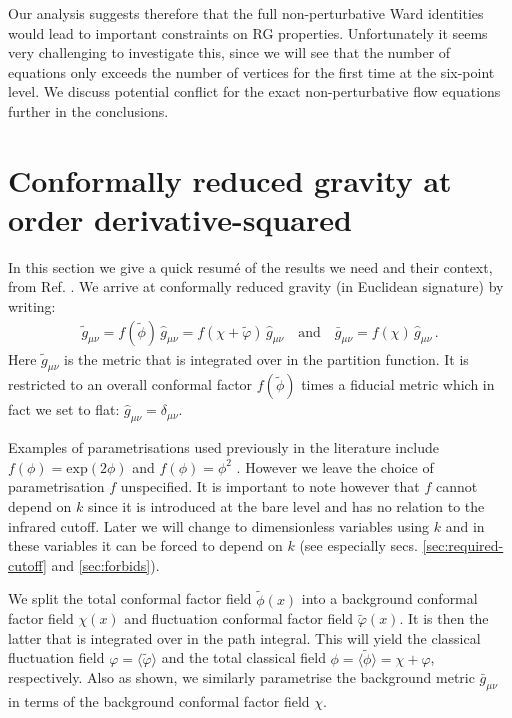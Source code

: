 \documentclass[11pt]{book} %
\newcommand{\vp}{\varphi}
\numberwithin{equation}{chapter}
\begin{document}
Our analysis suggests therefore that the full non-perturbative Ward identities would lead
to important constraints on RG properties. Unfortunately it seems very challenging to investigate this,
since we will see that the number of equations only exceeds the number of vertices for the first time
at the six-point level.
We discuss potential conflict for the exact non-perturbative flow equations further in the conclusions.


\section{Conformally reduced gravity at order derivative-squared}
\label{sec:review}

In this section we give a quick resum\'e of the results we need and their context,
from Ref. \cite{Dietz:2015owa}.
We arrive at conformally reduced gravity (in Euclidean signature) by writing:
\begin{align}
  \tilde g_{\mu\nu} = f(\tilde\phi) \, \hat g_{\mu\nu}
                    = f(\chi +\tilde\varphi ) \, \hat g_{\mu\nu}
  \quad \text{and} \quad
  \bar g_{\mu\nu} = f(\chi) \, \hat g_{\mu\nu} \,.
  \label{conformal-reduction}
\end{align}
Here $\tilde g_{\mu\nu}$ is the metric that is integrated over in the partition function.
It is restricted to an overall conformal factor $f(\tilde\phi)$ times a fiducial metric which
in fact we set to flat: $\hat g_{\mu\nu}=\delta_{\mu\nu}$.

Examples of parametrisations used previously in the literature include
$f(\phi) = \mathrm{exp}(2\phi)$ \cite{Machado:2009ph} and
$f(\phi) = \phi^2$ \cite{Manrique:2009uh, Bonanno:2012dg}.
However we leave the choice of parametrisation $f$ unspecified.
It is important to note however that $f$ cannot depend on $k$ since it is introduced at the bare level
and has no relation to the infrared cutoff.
Later we will change to dimensionless variables using $k$ and in these variables it can be forced
to depend on $k$ (see especially secs. \ref{sec:required-cutoff} and \ref{sec:forbids}).

We split the total conformal factor field $\tilde\phi(x)$ into a background conformal factor
field $\chi(x)$ and fluctuation conformal factor field $\tilde\vp(x)$.
It is then the latter that is integrated over in the path integral.
This will yield the classical fluctuation field $\vp = \langle \tilde \vp \rangle$ and the total classical
field $\phi = \langle \tilde \phi \rangle = \chi + \vp$, respectively.
Also as shown, we similarly parametrise the background
metric $\bar{g}_{\mu\nu}$ in terms of the background conformal factor field $\chi$.
\end{document}
